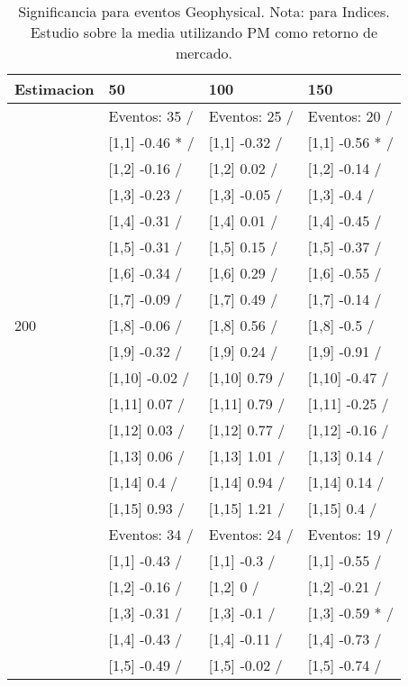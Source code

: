 \begin{table}

\caption{Significancia para eventos Geophysical. Nota: para Indices. Estudio sobre la media utilizando PM como retorno de mercado.}
\centering
\begin{tabular}[t]{llll}
\toprule
Estimacion & 50 & 100 & 150\\
\midrule
 & Eventos:  35 / & Eventos:  25 / & Eventos:  20 /\\
 & {}[1,1] -0.46 * / & {}[1,1] -0.32  / & {}[1,1] -0.56 * /\\
 & {}[1,2] -0.16  / & {}[1,2] 0.02  / & {}[1,2] -0.14  /\\
 & {}[1,3] -0.23  / & {}[1,3] -0.05  / & {}[1,3] -0.4  /\\
 & {}[1,4] -0.31  / & {}[1,4] 0.01  / & {}[1,4] -0.45  /\\
\addlinespace
 & {}[1,5] -0.31  / & {}[1,5] 0.15  / & {}[1,5] -0.37  /\\
 & {}[1,6] -0.34  / & {}[1,6] 0.29  / & {}[1,6] -0.55  /\\
 & {}[1,7] -0.09  / & {}[1,7] 0.49  / & {}[1,7] -0.14  /\\
200 & {}[1,8] -0.06  / & {}[1,8] 0.56  / & {}[1,8] -0.5  /\\
 & {}[1,9] -0.32  / & {}[1,9] 0.24  / & {}[1,9] -0.91  /\\
\addlinespace
 & {}[1,10] -0.02  / & {}[1,10] 0.79  / & {}[1,10] -0.47  /\\
 & {}[1,11] 0.07  / & {}[1,11] 0.79  / & {}[1,11] -0.25  /\\
 & {}[1,12] 0.03  / & {}[1,12] 0.77  / & {}[1,12] -0.16  /\\
 & {}[1,13] 0.06  / & {}[1,13] 1.01  / & {}[1,13] 0.14  /\\
 & {}[1,14] 0.4  / & {}[1,14] 0.94  / & {}[1,14] 0.14  /\\
\addlinespace
 & {}[1,15] 0.93  / & {}[1,15] 1.21  / & {}[1,15] 0.4  /\\
 & Eventos:  34 / & Eventos:  24 / & Eventos:  19 /\\
 & {}[1,1] -0.43  / & {}[1,1] -0.3  / & {}[1,1] -0.55  /\\
 & {}[1,2] -0.16  / & {}[1,2] 0  / & {}[1,2] -0.21  /\\
 & {}[1,3] -0.31  / & {}[1,3] -0.1  / & {}[1,3] -0.59 * /\\
\addlinespace
 & {}[1,4] -0.43  / & {}[1,4] -0.11  / & {}[1,4] -0.73  /\\
 & {}[1,5] -0.49  / & {}[1,5] -0.02  / & {}[1,5] -0.74  /\\

\end{tabular}
\end{table}
